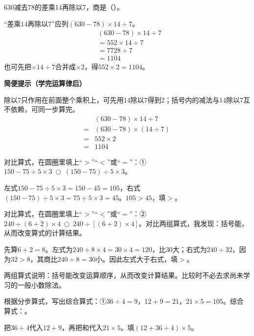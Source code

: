 630减去78的差乘14再除以7，商是（\hspace{1.8em}）。\par
\begin{BookAnswer}
“差乘\(14\)再除以\(7\)”应列\((630-78)\times14\div7\)。\[\begin{aligned}&(630-78)\times14\div7\\&=552\times14\div7\\&=7728\div7\\&=1104\end{aligned}\]也可先把\(\times14\div7\)合并成\(\times2\)，得\(552\times2=1104\)。\par\textbf{简便提示（学完运算律后）}\par 除以7只作用在前面整个乘积上，可先用14除以7得到2；括号内的减法与14除以7互不依赖，可同一步算完。\[\begin{aligned}&(630-78)\times14\div7\\={}&(630-78)\times(14\div7)\\={}&552\times2\\={}&1104\end{aligned}\]
\end{BookAnswer}

对比算式，在圆圈里填上“\(>\)”“\(<\)”或“\(=\)”：①\(150-75\div5\times3\ \bigcirc\ (150-75)\div5\times3\)。\par
\begin{BookAnswer}
左式\(150-75\div5\times3=150-45=105\)，右式\((150-75)\div5\times3=75\div5\times3=45\)。\(105>45\)，填\(>\)。
\end{BookAnswer}

对比算式，在圆圈里填上“\(>\)”“\(<\)”或“\(=\)”：②\(240\div(6+2)\times4\ \bigcirc\ 240\div[(6+2)\times4]\)。对比两组算式，我发现：括号能\BookBlank{}，从而改变算式的计算结果。\par
\begin{BookAnswer}
先算\(6+2=8\)。左式为\(240\div8\times4=30\times4=120\)，比30大；右式为\(240\div32\)，因为\(32>8\)，其商比\(240\div8=30\)小。因此左式大于右式，填\(>\)。\par 两组算式说明：括号能改变运算顺序，从而改变计算结果。比较时不必去求尚未学习的一般小数除法。
\end{BookAnswer}

根据分步算式，写出综合算式：①\(36\div4=9\)，\allowbreak{}\(12+9=21\)，\allowbreak{}\(21\times5=105\)。综合算式：\BookBlank{}。\par
\begin{BookAnswer}
把\(36\div4\)代入\(12+9\)，再把和代入\(21\times5\)。填\((12+36\div4)\times5\)。
\end{BookAnswer}

